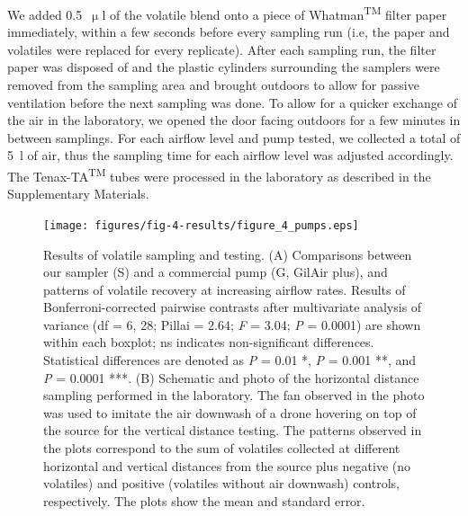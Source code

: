 We added 0.5~$\upmu$l of the volatile blend onto a piece of Whatman\textsuperscript{TM} filter paper immediately, within a few seconds before every sampling run (i.e, the paper and volatiles were replaced for every replicate). After each sampling run, the filter paper was disposed of and the plastic cylinders surrounding the samplers were removed from the sampling area and brought outdoors to allow for passive ventilation before the next sampling was done. To allow for a quicker exchange of the air in the laboratory, we opened the door facing outdoors for a few minutes in between samplings. For each airflow level and pump tested, we collected a total of 5~l of air, thus the sampling time for each airflow level was adjusted accordingly. The Tenax-TA\textsuperscript{TM} tubes were processed in the laboratory as described in the Supplementary Materials. 
 

\begin{figure}[!t]
\centering
\texttt{[image: figures/fig-4-results/figure\_4\_pumps.eps]}
\caption{Results of volatile sampling and testing. (A) Comparisons between our sampler (S) and a commercial pump (G, GilAir plus), and patterns of volatile recovery at increasing airflow rates. Results of Bonferroni-corrected pairwise contrasts after multivariate analysis of variance (df = 6, 28; Pillai = 2.64; \textit{F} = 3.04; \textit{P} = 0.0001) are shown within each boxplot; ns indicates non-significant differences. Statistical differences are denoted as \textit{P} = 0.01 *, \textit{P} = 0.001 **, and \textit{P} = 0.0001 ***. (B) Schematic and photo of the horizontal distance sampling performed in the laboratory. The fan observed in the photo was used to imitate the air downwash of a drone hovering on top of the source for the vertical distance testing. The patterns observed in the plots correspond to the sum of volatiles collected at different horizontal and vertical distances from the source plus negative (no volatiles) and positive (volatiles without air downwash) controls, respectively. The plots show the mean and standard error.}
\label{Flowrate_results}
\end{figure}



